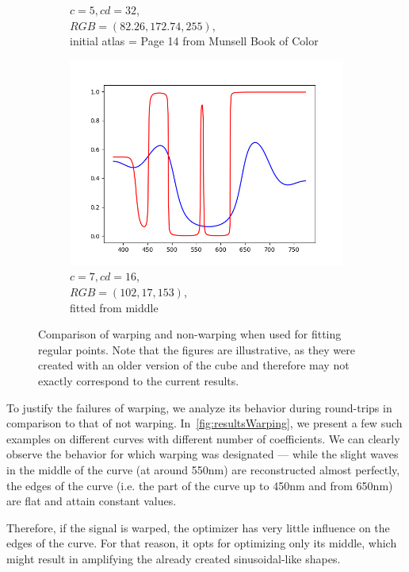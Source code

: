 \begin{figure}[t]
\begin{subfigure}[t]{0.31\textwidth}
		\caption{$c=5, cd=32$,\\$RGB=(82.26, 172.74, 255)$,\\initial atlas = Page 14 from Munsell Book of Color}
		\label{fig:warping_regularPoints_m5_cd32}
	\end{subfigure}
	\begin{subfigure}[t]{0.31\textwidth}
		\includegraphics[width=\linewidth]{img/resultsTechniqueOpt_m7_cd16.png}
		\caption{$c=7, cd=16$,\\$RGB=(102, 17, 153)$,\\ fitted from middle}
		\label{fig:warping_regularPoints_m7_cd16}
	\end{subfigure} 
	\caption{Comparison of warping and non-warping when used for fitting regular points. Note that the figures are illustrative, as they were created with an older version of the cube and therefore may not exactly correspond to the current results.}
	\label{fig:warping_regularPoints}
\end{figure}

To justify the failures of warping, we analyze its behavior during round-trips in comparison to that of not warping. In~\cref{fig:resultsWarping}, we present a few such examples on different curves with different number of coefficients. We can clearly observe the behavior for which warping was designated --- while the slight waves in the middle of the curve (at around 550nm) are reconstructed almost perfectly, the edges of the curve (i.e. the part of the curve up to 450nm and from 650nm) are flat and attain constant values.

Therefore, if the signal is warped, the optimizer has very little influence on the edges of the curve. For that reason, it opts for optimizing only its middle, which might result in amplifying the already created sinusoidal-like shapes.

